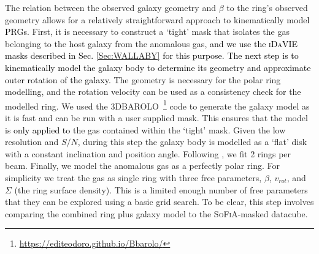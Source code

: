 \documentclass[fleqn,usenatbib]{mnras}
\newcommand{\barolo}{\textsc{3DBAROLO}~}
\newcommand{\KS}[1]{\textcolor{black}{#1}}
\begin{document}
The relation between the observed galaxy geometry and $\beta$ to the ring's observed geometry allows for a relatively straightforward approach to kinematically \textcolor{black}{model PRGs}.  First, it is necessary to construct a `tight' mask that isolates the gas belonging to the host galaxy from the anomalous gas, \KS{and we use the \textsc{iDaVIE}  masks described in Sec. \ref{Sec:WALLABY} for this purpose. The next step is to kinematically model the galaxy body to determine its geometry and approximate outer rotation of the galaxy.}  The geometry is necessary for the polar ring modelling, and the rotation velocity can be used as a consistency check for the modelled ring.  We used the \barolo\footnote{\href{https://editeodoro.github.io/Bbarolo/}{https://editeodoro.github.io/Bbarolo/}} code \citep{diTeodoro15} to generate the galaxy model as it is fast and can be run with a user supplied mask.  This ensures that the model is \KS{only applied to} the gas contained within the `tight' mask.  Given the low resolution and $S/N$, during this step the galaxy body is modelled as a `flat' disk with a constant inclination and position angle.  Following \citet{Deg2022}, we fit 2 rings per beam.  Finally, we model the anomalous gas as a perfectly polar ring.  For simplicity we treat the gas as single ring with three free parameters, $\beta$, $v_{rot}$, and $\Sigma$ (the ring surface density).  This is a limited enough number of free parameters that they can be explored using a basic grid search.  To be clear, this step involves comparing the combined ring plus galaxy model to the \textsc{SoFiA}-masked datacube.




\end{document}

